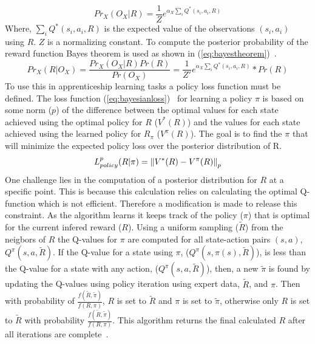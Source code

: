 \documentclass[12pt,american]{report}
\begin{document}
\begin{equation}
            \label{eq:bayseianliklihood}
            Pr_X(O_X|R) =  \frac{1}{Z}e^{\alpha_X\sum_{i}^{}Q^*(s_i,a_i,R)}%
        \end{equation}
Where, $\sum_{i}^{}Q^*(s_i,a_i,R)$ is the expected value of the observations $(s_i,a_i)$ using $R$. $Z$ is a normalizing constant. To compute the posterior probability of the reward function Bayes theorem is used as shown in (\ref{eq:bayestheorem})~\cite{ramachandran2007bayesian}.
\begin{equation}
            \label{eq:bayestheorem}
            Pr_X(R|O_X) =  \frac{Pr_X(O_X|R)Pr(R)}{Pr(O_X)}= \frac{1}{Z'}e^{\alpha_X\sum_{i}^{}Q^*(s_i,a_i,R)}*Pr(R)%
        \end{equation}
To use this in apprenticeship learning tasks a policy loss function must be defined. The loss function (\ref{eq:bayesianloss})~\cite{ramachandran2007bayesian} for learning a policy $\pi$ is based on some norm ($p$) of the difference between the optimal values for each state achieved using the optimal policy for $R$ ($V^*(R)$) and the values for each state achieved using the learned policy for $R_{\pi}$ ($V^\pi(R)$).  The goal is to find the $\pi$ that will minimize the expected policy loss over the posterior distribution of R.  
\begin{equation}
            \label{eq:bayesianloss}
            L_{policy}^{p}(R|\pi)=\norm{V^*(R)-V^\pi(R)}_p%
        \end{equation}
One challenge lies in the computation of a posterior distribution for $R$ at a specific point.  This is because this calculation relies on calculating the optimal Q-function which is not efficient.  Therefore a modification is made to release this constraint.  As the algorithm learns it keeps track of the policy ($\pi$) that is optimal for the current infered reward ($R$).  Using a uniform sampling ($\tilde{R}$) from the neigbors of $R$ the Q-values for $\pi$ are computed for all state-action pairs $(s,a)$, $Q^\pi(s,a,\tilde{R})$. If the Q-value for a state using $\pi$, ($Q^\pi(s,\pi(s),\tilde{R})$), is less than the Q-value for a state with any action, ($Q^\pi(s,a,\tilde{R})$), then, a new $\tilde{\pi}$ is found by updating the Q-values using policy iteration using expert data, $\tilde{R}$, and $\pi$. Then with probability of $\frac{f(\tilde{R},\tilde{\pi})}{f(R,\pi)}$, $R$ is set to $\tilde{R}$ and $\pi$ is set to $\tilde{\pi}$, otherwise only $R$ is set to $\tilde{R}$  with probability $\frac{f(\tilde{R},\tilde{\pi})}{f(R,\pi)}$.  This algorithm returns the final calculated $R$ after all iterations are complete~\cite{ramachandran2007bayesian}.
\end{document}
